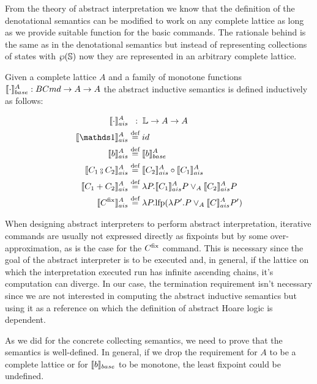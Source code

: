 \documentclass[
  10pt,       %
  twoside,    %
  a4paper,    %
  english,    %
  tikz,       %
  openright,  %
]{book}
\begin{document}
From the theory of abstract interpretation we know that the definition of the
denotational semantics can be modified to work on any complete lattice as long
as we provide suitable function for the basic commands. The rationale
behind is the same as in the denotational semantics but instead of representing
collections of states with $\wp(\mathbb{S})$ now they are represented in an
arbitrary complete lattice.

\begin{definition}

  \label{def:abstract-inductive-semantics}
  Given a complete lattice $A$ and a family of monotone functions $\llbracket \cdot \rrbracket_{base}^A : 
  BCmd \to A \to A$ the abstract inductive semantics is defined inductively as 
  follows:

  \begin{align*}
      \asem{\cdot}         & \;\;:\; \lang \to A \to A \\
      \asem{\sskip}         &\defeq id \\
      \asem{b}             &\defeq \bsem{b}^A \\
      \asem{C_1 \fcmp C_2} &\defeq \asem{C_2} \circ \asem{C_1} \\
      \asem{C_1 + C_2}     &\defeq \lambda P . \asem{C_1} P \join_A \asem{C_2} P \\
      \asem{C^\fix}        &\defeq \lambda P . \lfp(\lambda P'. P \join_A \asem{C} P')
  \end{align*}
\end{definition}


When designing abstract interpreters to perform abstract interpretation,
iterative commands are usually not expressed directly as fixpoints but by
some over-approximation, as is the case for the $C^{\mathrm{fix}}$ command. This is
necessary since the goal of the abstract interpreter is to be executed and, in
general, if the lattice on which the interpretation executed run has infinite
ascending chains, it's computation can diverge. In our case, the termination
requirement isn't necessary since we are not interested in computing the abstract
inductive semantics but using it as a reference on which the definition of
abstract Hoare logic is dependent.


As we did for the concrete collecting semantics, we need to prove that the
semantics is well-defined. In general, if we drop the requirement for $A$
to be a complete lattice or for $\llbracket b \rrbracket_{base}$ to be monotone, the least fixpoint
could be undefined.
\end{document}
